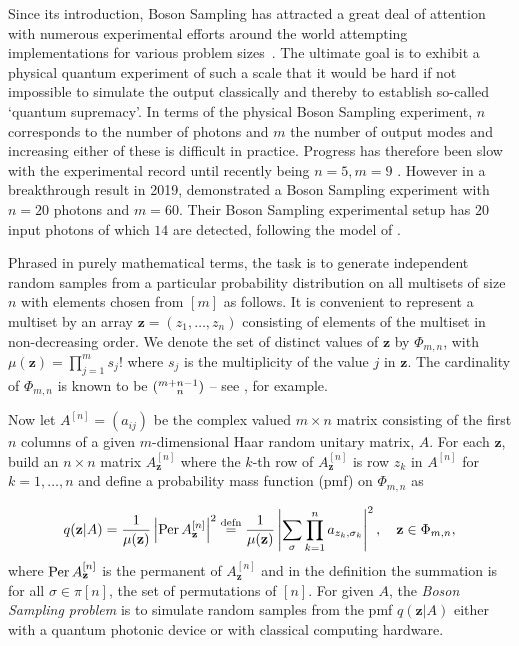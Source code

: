 \documentclass[a4paper,11pt]{article}
\newcommand{\perm}{\mathop{\textup{Per}}}
\newcommand{\multichoose}[2]{(^{#1+#2-1}_{\hphantom{#1+}#2})}
\def\BS/{Boson Sampling}
\begin{document}
Since its introduction, \BS/ has attracted a great deal of attention with numerous experimental efforts around the world attempting implementations for various problem sizes~\citep[see e.g.\@][]{spring2013boson,bentivegna2015experimental,broome2013photonic,tillmann2013experimental,crespi2013integrated,spagnolo2014experimental,LSS:2016}. The ultimate goal is to exhibit a physical quantum experiment of such a scale that it would be hard if not impossible to simulate the output classically and thereby to establish so-called `quantum supremacy'.    In terms of the physical \BS/ experiment, $n$ corresponds to the number of photons and $m$ the number of output modes and increasing either of these is difficult in practice. Progress has therefore been slow \citep[see][and the references therein]{LBR:2017} with the experimental record until recently being $n = 5,  m = 9$ \citep[]{Wang2016}.   However in a breakthrough result in 2019, \citeauthor{Wang:2019} demonstrated a \BS/ experiment with $n=20$ photons and $m=60$. Their \BS/ experimental setup has $20$ input photons of which $14$ are detected, following the model of \citet{AB:2016}.

Phrased in purely mathematical terms, the task is to generate independent random samples from a particular probability distribution on all multisets of size $n$ with elements chosen from $[m]$ as follows. It is convenient to represent a multiset by an array  $\mathbf{z} = (z_1,\dots,z_n)$ consisting of elements of the multiset in non-decreasing order. We denote the set of distinct values of $\mathbf{z}$ by $\Phi_{m,n}$, with $\mu(\mathbf{z}) = \prod_{j=1}^m s_j!$ where $s_j$ is the multiplicity of the value $j$ in $\mathbf{z}$. The cardinality of $\Phi_{m,n}$ is known to be $\multichoose{m}{n}$ -- see \citet{Feller:1968}, for example.

Now let $A^{[n]} = (a_{ij})$ be the complex valued $m \times n$ matrix consisting of the first $n$ columns of a given 
$m$-dimensional  Haar random unitary matrix, $A$. For each $\mathbf{z}$, build an $n \times n$ matrix $A^{[n]}_{\mathbf{z}}$ where the $k$-th row  of $A^{[n]}_{\mathbf{z}}$ is row $z_k$ in $A^{[n]}$ for $k=1,\dots,n$ and define a probability mass function (pmf) on $\Phi_{m,n}$ as

\begin{equation}\label{eq:Bz_s}
q(\mathbf{z}|A) 
= \frac{1}{\mu(\mathbf{z})} \left| \perm A^{[n]}_{\mathbf{z}}\right|^2 
\overset{\text{defn}}{=} \frac{1}{\mu(\mathbf{z})} \left| \sum_{\sigma} \prod_{k=1}^n a_{z_k,\sigma_k}\right|^2, \quad \mathbf{z} \in \Phi_{m,n},
\end{equation}
where $\perm A^{[n]}_{\mathbf{z}}$ is the permanent of $A^{[n]}_{\mathbf{z}}$ and in the definition the summation is for all  $\sigma \in \pi[n]$,  the set of permutations of $[n]$.  For given $A$, the  \textit{\BS/ problem} is to simulate random samples from the pmf $q(\mathbf{z}|A)$ either with a quantum photonic device or with classical computing hardware. 
\end{document}

